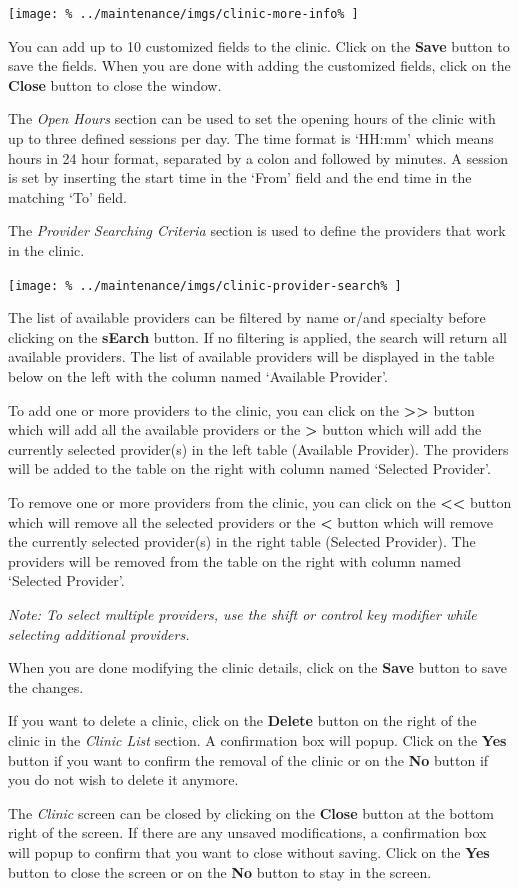 \documentclass[../main/main]{subfiles}
\begin{document}
\texttt{[image: \%
  ../maintenance/imgs/clinic-more-info\%
]}

You can add up to 10 customized fields to the clinic. Click on the
\textbf{Save} button to save the fields. When you are done with adding the
customized fields, click on the \textbf{Close} button to close the window.

The \emph{Open Hours} section can be used to set the opening hours of the
clinic with up to three defined sessions per day. The time format is `HH:mm'
which means hours in 24 hour format, separated by a colon and followed by
minutes. A session is set by inserting the start time in the `From'
field and the end time in the matching `To' field.

The \emph{Provider Searching Criteria} section is used to define the providers
that work in the clinic.

\texttt{[image: \%
  ../maintenance/imgs/clinic-provider-search\%
]}

The list of available providers can be filtered by name or/and specialty before
clicking on the \textbf{sEarch} button. If no filtering is applied, the search
will return all available providers. The list of available providers will
be displayed in the table below on the left with the column named `Available
Provider'.

To add one or more providers to the clinic, you can click on the \textbf{>>}
button which will add all the available providers or the \textbf{>} button
which will add the currently selected provider(s) in the left table (Available
Provider). The providers will be added to the table on the right with column
named `Selected Provider'.

\pagebreak
To remove one or more providers from the clinic, you can click on the
\textbf{<<} button which will remove all the selected providers or the
\textbf{<} button which will remove the currently selected provider(s) in the
right table (Selected Provider). The providers will be removed from the table
on the right with column named `Selected Provider'.

\emph{Note: To select multiple providers, use the shift or control key modifier
while selecting additional providers.}

When you are done modifying the clinic details, click on the \textbf{Save}
button to save the changes.

If you want to delete a clinic, click on the \textbf{Delete} button on the right
of the clinic in the \emph{Clinic List} section. A confirmation box will popup.
Click on the \textbf{Yes} button if you want to confirm the removal of the
clinic or on the \textbf{No} button if you do not wish to delete it anymore.

The \emph{Clinic} screen can be closed by clicking on the
\textbf{Close} button at the bottom right of the screen. If there are any
unsaved modifications, a confirmation box will popup to confirm that you want
to close without saving. Click on the \textbf{Yes} button to close the screen
or on the \textbf{No} button to stay in the screen.
\end{document}
